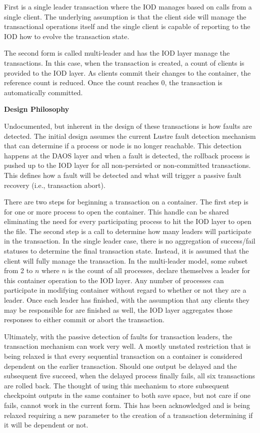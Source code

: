 \documentclass[conference]{IEEEtran}
\begin{document}
First is a single leader transaction where the IOD manages based on calls from
a single client. The underlying assumption is that the client side will manage
the transactional operations itself and the single client is capable of
reporting to the IOD how to evolve the transaction state. 

The second form is called multi-leader and has the IOD layer manage the
transactions. In this case, when the transaction is created, a count of clients
is provided to the IOD layer. As clients commit their changes to the container,
the reference count is reduced. Once the count reaches 0, the transaction is
automatically committed.

\noindent\textbf{Design Philosophy}

Undocumented, but inherent in the design of these transactions is how faults
are detected. The initial design assumes the current Lustre fault detection
mechanism that can determine if a process or node is no longer reachable. This
detection happens at the DAOS layer and when a fault is detected, the rollback
process is pushed up to the IOD layer for all non-persisted or non-committed
transactions. This defines how a fault will be detected and what will trigger a
passive fault recovery (i.e., transaction abort).

There are two steps for beginning a transaction on a container. The first step
is for one or more process to open the container. This handle can be shared
eliminating the need for every participating process to hit the IOD layer to
open the file. The second step is a call to determine how many leaders will
participate in the transaction. In the single leader case, there is no
aggregation of success/fail statuses to determine the final transaction state.
Instead, it is assumed that the client will fully manage the transaction. In
the multi-leader model, some subset from 2 to $n$ where $n$ is the count of all
processes, declare themselves a leader for this container operation to the IOD
layer. Any number of processes can participate in modifying container without
regard to whether or not they are a leader. Once each leader has finished, with
the assumption that any clients they may be responsible for are finished as
well, the IOD layer aggregates those responses to either commit or abort the
transaction.

Ultimately, with the passive detection of faults for transaction leaders, the
transaction mechanism can work very well. A mostly unstated restriction that is
being relaxed is that every sequential transaction on a container is considered
dependent on the earlier transaction. Should one output be delayed and the
subsequent five succeed, when the delayed process finally fails, all six
transactions are rolled back. The thought of using this mechanism to store
subsequent checkpoint outputs in the same container to both save space, but not
care if one fails, cannot work in the current form. This has been acknowledged
and is being relaxed requiring a new parameter to the creation of a transaction
determining if it will be dependent or not.
\end{document}
